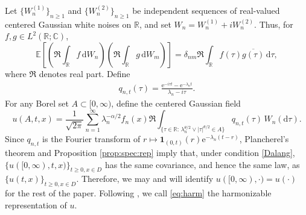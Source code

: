 \documentclass[reqno]{amsart}
\newcommand{\R}{\mathbb R}
\newcommand{\E}{\mathbb E}
\renewcommand{\d}{\mathrm d}
\newcommand{\e}{\mathrm e}
\newcommand{\1}{\mathbf 1}
\numberwithin{equation}{section}
\newtheorem{lemma}[theorem]{Lemma}
\theoremstyle{definition}
\begin{document}
Let \(\{W_n^{(1)}\}_{n\ge1}\) and \(\{W_n^{(2)}\}_{n\ge1}\) be independent
sequences of real-valued centered Gaussian white noises on \(\R\), and set
\(W_n=W_n^{(1)}+iW_n^{(2)}\). Thus, for \(f,g\in L^2(\R;\mathbb C)\),
\[
    \E\left[\left(\Re\int_\R f\,\d W_n\right)
             \left(\Re\int_\R g\,\d W_m\right)\right]
    =\delta_{nm}\Re\int_\R f(\tau)\overline{g(\tau)}\,\d\tau,
\]
where $\Re$ denotes real part.
Define
\begin{align}\label{q}
    q_{n,t}(\tau)
    =\frac{\e^{-i\tau t}-\e^{-\lambda_n t}}{\lambda_n-i\tau}.
\end{align}
For any Borel set \(A\subset [0,\infty)\), define the centered Gaussian field
\begin{equation}\label{eq:harm}
    u(A,t,x)
    =\frac1{\sqrt{2\pi}}
    \sum_{n=1}^{\infty}\lambda_n^{-\alpha/2}f_n(x)
    \Re\int_{\{\tau \in \R:\,\lambda_n^{\theta/2}\vee|\tau|^{\theta/2}\in A\}}
    q_{n,t}(\tau)\,W_n(\d\tau).
\end{equation}
Since \(q_{n,t}\) is the Fourier transform of
\(r\mapsto\1_{(0,t)}(r)\e^{-\lambda_n(t-r)}\), Plancherel's theorem and Proposition \ref{prop:spec:rep} imply that, under condition \eqref{Dalang}, $\{u([0,\infty),t,x)\}_{t \ge 0, x \in D}$ has the same covariance, and hence the same law, as $\{ u(t,x) \}_{t \ge 0, x \in D}$.
Therefore, we may and will identify $u([0,\infty),\cdot) = u(\cdot)$ for the rest of the paper.
Following \cite{Balan12,DMX17,LX23}, we call \eqref{eq:harm} the harmonizable representation of $u$.

\end{document}
